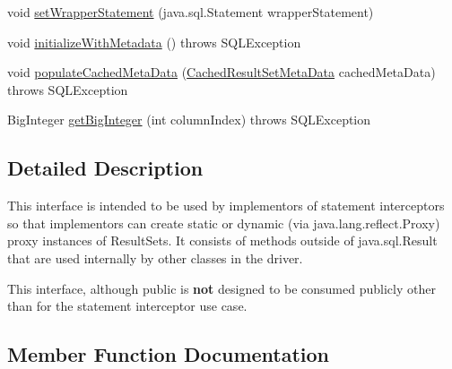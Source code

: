 \begin{DoxyCompactItemize}
\item 
void \mbox{\hyperlink{interfacecom_1_1mysql_1_1cj_1_1jdbc_1_1result_1_1_result_set_internal_methods_aeaa719d2c55d3e0c32bd5b47b4020009}{set\+Wrapper\+Statement}} (java.\+sql.\+Statement wrapper\+Statement)
\item 
void \mbox{\hyperlink{interfacecom_1_1mysql_1_1cj_1_1jdbc_1_1result_1_1_result_set_internal_methods_aee66378b04271c5eacc9811a8d884a06}{initialize\+With\+Metadata}} ()  throws S\+Q\+L\+Exception
\item 
void \mbox{\hyperlink{interfacecom_1_1mysql_1_1cj_1_1jdbc_1_1result_1_1_result_set_internal_methods_ac9b67f368406db152383d3244f7c2d08}{populate\+Cached\+Meta\+Data}} (\mbox{\hyperlink{interfacecom_1_1mysql_1_1cj_1_1jdbc_1_1result_1_1_cached_result_set_meta_data}{Cached\+Result\+Set\+Meta\+Data}} cached\+Meta\+Data)  throws S\+Q\+L\+Exception
\item 
Big\+Integer \mbox{\hyperlink{interfacecom_1_1mysql_1_1cj_1_1jdbc_1_1result_1_1_result_set_internal_methods_abc94356474330c07d9404386b2a373b5}{get\+Big\+Integer}} (int column\+Index)  throws S\+Q\+L\+Exception
\end{DoxyCompactItemize}


\subsection{Detailed Description}
This interface is intended to be used by implementors of statement interceptors so that implementors can create static or dynamic (via java.\+lang.\+reflect.\+Proxy) proxy instances of Result\+Sets. It consists of methods outside of java.\+sql.\+Result that are used internally by other classes in the driver.

This interface, although public is {\bfseries not} designed to be consumed publicly other than for the statement interceptor use case. 

\subsection{Member Function Documentation}
\mbox{\label{interfacecom_1_1mysql_1_1cj_1_1jdbc_1_1result_1_1_result_set_internal_methods_abc94356474330c07d9404386b2a373b5}} 
